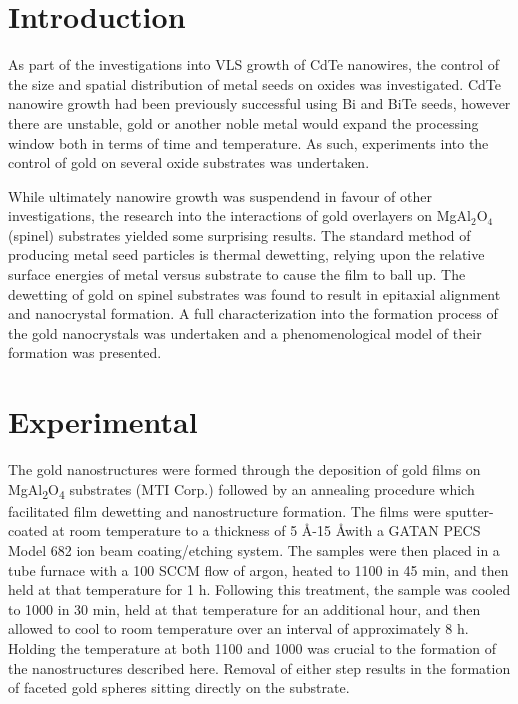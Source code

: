 \section{Introduction}
As part of the investigations into VLS growth of CdTe nanowires, the control of the size and spatial distribution of metal seeds on oxides was investigated. CdTe nanowire growth had been previously successful using Bi and BiTe seeds, however there are unstable, gold or another noble metal would expand the processing window both in terms of time and temperature. As such, experiments into the control of gold on several oxide substrates was undertaken.

While ultimately nanowire growth was suspendend in favour of other investigations, the research into the interactions of gold overlayers on MgAl$_2$O$_4$ (spinel) substrates yielded some surprising results. The standard method of producing metal seed particles is thermal dewetting, relying upon the relative surface energies of metal versus substrate to cause the film to ball up. The dewetting of gold on spinel substrates was found to result in epitaxial alignment and nanocrystal formation. A full characterization into the formation process of the gold nanocrystals was undertaken and a phenomenological model of their formation was presented.

\section{Experimental}
The gold nanostructures were formed through the deposition of gold films on MgAl\textsubscript{2}O\textsubscript{4} substrates (MTI Corp.)
followed by an annealing procedure which facilitated film
dewetting and nanostructure formation. The films were
sputter-coated at room temperature to a thickness of 5 \AA-15
\AA with a GATAN PECS Model 682 ion beam coating/etching system. The samples were then placed in a tube
furnace with a 100 SCCM flow of argon, heated to 1100 \celsius{}
in 45 min, and then held at that temperature for 1 h.
Following this treatment, the sample was cooled to 1000 \celsius{}
in 30 min, held at that temperature for an additional hour,
and then allowed to cool to room temperature over an interval
of approximately 8 h. Holding the temperature at both 1100
and 1000 \celsius{} was crucial to the formation of the nanostructures described here. Removal of either step results in the formation of faceted gold spheres sitting directly on the substrate.


